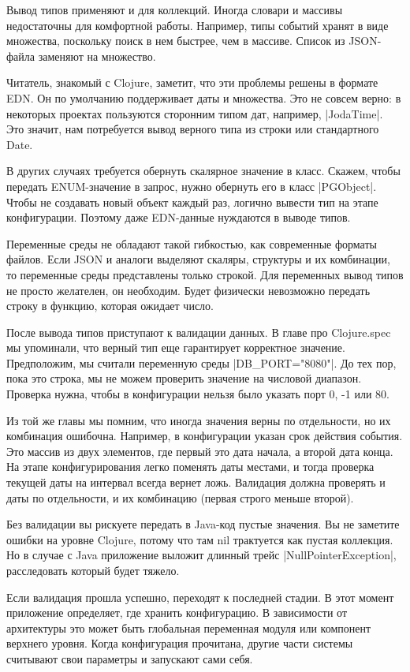 Вывод типов применяют и для коллекций. Иногда словари и массивы недостаточны для
комфортной работы. Например, типы событий хранят в виде множества, поскольку
поиск в нем быстрее, чем в массиве. Список из JSON-файла заменяют на множество.


Читатель, знакомый с Clojure, заметит, что эти проблемы решены в формате EDN. Он
по умолчанию поддерживает даты и множества. Это не совсем верно: в некоторых
проектах пользуются сторонним типом дат, например, \spverb|JodaTime|. Это
значит, нам потребуется вывод верного типа из строки или стандартного Date.

В других случаях требуется обернуть скалярное значение в класс. Скажем, чтобы
передать ENUM-значение в запрос, нужно обернуть его в класс \spverb|PGObject|. Чтобы не
создавать новый объект каждый раз, логично вывести тип на этапе
конфигурации. Поэтому даже EDN-данные нуждаются в выводе типов.

Переменные среды не обладают такой гибкостью, как современные форматы
файлов. Если JSON и аналоги выделяют скаляры, структуры и их комбинации, то
переменные среды представлены только строкой. Для переменных вывод типов не
просто желателен, он необходим. Будет физически невозможно передать строку в
функцию, которая ожидает число.

После вывода типов приступают к валидации данных. В главе про Clojure.spec мы
упоминали, что верный тип еще гарантирует корректное значение. Предположим, мы
считали переменную среды \spverb|DB_PORT="8080"|. До тех пор, пока это строка, мы не
можем проверить значение на числовой диапазон. Проверка нужна, чтобы в
конфигурации нельзя было указать порт 0, -1 или 80.

Из той же главы мы помним, что иногда значения верны по отдельности, но их
комбинация ошибочна. Например, в конфигурации указан срок действия события. Это
массив из двух элементов, где первый это дата начала, а второй дата конца. На
этапе конфигурирования легко поменять даты местами, и тогда проверка текущей
даты на интервал всегда вернет ложь. Валидация должна проверять и даты по
отдельности, и их комбинацию (первая строго меньше второй).

Без валидации вы рискуете передать в Java-код пустые значения. Вы не заметите
ошибки на уровне Clojure, потому что там nil трактуется как пустая коллекция. Но
в случае с Java приложение выложит длинный трейс \spverb|NullPointerException|,
расследовать который будет тяжело.

Если валидация прошла успешно, переходят к последней стадии. В этот момент
приложение определяет, где хранить конфигурацию. В зависимости от архитектуры
это может быть глобальная переменная модуля или компонент верхнего уровня. Когда
конфигурация прочитана, другие части системы считывают свои параметры и
запускают сами себя.

